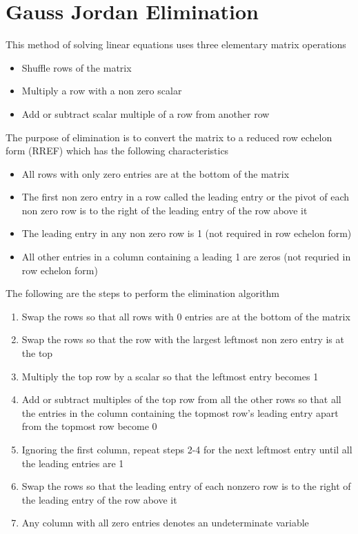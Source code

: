 \documentclass[../../linear_algebra.tex]{subfiles}
\begin{document}
\section{Gauss Jordan Elimination}\label{sec:gaussjordan}
This method of solving linear equations uses three elementary matrix operations
\begin{itemize}
    \item Shuffle rows of the matrix
    \item Multiply a row with a non zero scalar
    \item Add or subtract scalar multiple of a row from another row
\end{itemize}

The purpose of elimination is to convert the matrix to a reduced row echelon form (RREF) which has the following characteristics
\begin{itemize}
    \item All rows with only zero entries are at the bottom of the matrix
    \item The first non zero entry in a row called the leading entry or the pivot of each non zero row is to the right of the leading entry of the row above it
    \item The leading entry in any non zero row is 1 (not required in row echelon form)
    \item All other entries in a column containing a leading 1 are zeros (not requried in row echelon form)
\end{itemize}
The following are the steps to perform the elimination algorithm
\begin{enumerate}
    \item Swap the rows so that all rows with 0 entries are at the bottom of the matrix
    \item Swap the rows so that the row with the largest leftmost non zero entry is at the top
    \item Multiply the top row by a scalar so that the leftmost entry becomes 1
    \item Add or subtract multiples of the top row from all the other rows so that all the entries in the column containing the topmost row's leading entry apart from the topmost row become 0
    \item Ignoring the first column, repeat steps 2-4 for the next leftmost entry until all the leading entries are 1
    \item Swap the rows so that the leading entry of each nonzero row is to the right of the leading entry of the row above it
    \item Any column with all zero entries denotes an undeterminate variable
\end{enumerate}
\end{document}
